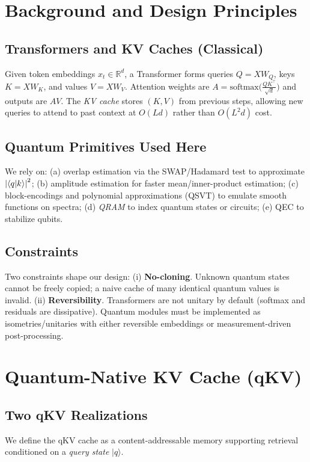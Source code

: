 \documentclass[11pt]{article}
\newcommand{\softmax}{\mathrm{softmax}}
\newcommand{\qket}[1]{\lvert #1 \rangle}
\newcommand{\qip}[2]{\langle #1 \vert #2 \rangle}
\begin{document}
\section{Background and Design Principles}

\subsection{Transformers and KV Caches (Classical)}
Given token embeddings $x_t\in\mathbb{R}^d$, a Transformer forms queries $Q=XW_Q$, keys $K=XW_K$, and values $V=XW_V$.
Attention weights are $A=\softmax\big(\tfrac{QK^\top}{\sqrt{d}}\big)$ and outputs are $AV$.
The \emph{KV cache} stores $(K,V)$ from previous steps, allowing new queries to attend to past context at $O(Ld)$ rather than $O(L^2 d)$ cost.

\subsection{Quantum Primitives Used Here}
We rely on: (a) overlap estimation via the SWAP/Hadamard test to approximate $\abs{\qip{q}{k}}^2$; (b) amplitude estimation for faster mean/inner-product estimation; (c) block-encodings and polynomial approximations (QSVT) to emulate smooth functions on spectra; (d) \emph{QRAM} to index quantum states or circuits; (e) QEC to stabilize qubits.

\subsection{Constraints}
Two constraints shape our design:
(i) \textbf{No-cloning}.
Unknown quantum states cannot be freely copied; a naive cache of many identical quantum values is invalid.
(ii) \textbf{Reversibility}.
Transformers are not unitary by default (softmax and residuals are dissipative).
Quantum modules must be implemented as isometries/unitaries with either reversible embeddings or measurement-driven post-processing.

\section{Quantum-Native KV Cache (qKV)}

\subsection{Two qKV Realizations}
We define the qKV cache as a content-addressable memory supporting retrieval conditioned on a \emph{query state} $\qket{q}$.
\end{document}
